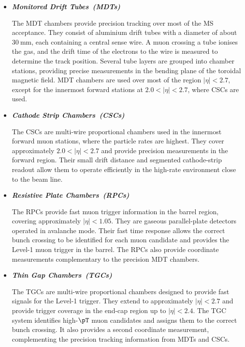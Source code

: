 \begin{itemize}
    \item \textbf{\textit{Monitored Drift Tubes~(MDTs)\quad}}

    The MDT chambers provide precision tracking over most of the MS acceptance.
    They consist of aluminium drift tubes with a diameter of about $30~\mathrm{mm}$, each containing a central sense wire.
    A muon crossing a tube ionises the gas, and the drift time of the electrons to the wire is measured to determine the track position.
    Several tube layers are grouped into chamber stations, providing precise measurements in the bending plane of the toroidal magnetic field.
    MDT chambers are used over most of the region $|\eta|<2.7$, except for the innermost forward stations at $2.0<|\eta|<2.7$, where CSCs are used.

    \item \textbf{\textit{Cathode Strip Chambers~(CSCs)\quad}}

    The CSCs are multi-wire proportional chambers used in the innermost forward muon stations, where the particle rates are highest.
    They cover approximately $2.0<|\eta|<2.7$ and provide precision measurements in the forward region.
    Their small drift distance and segmented cathode-strip readout allow them to operate efficiently in the high-rate environment close to the beam line.

    \item \textbf{\textit{Resistive Plate Chambers~(RPCs)\quad}}

    The RPCs provide fast muon trigger information in the barrel region, covering approximately $|\eta|<1.05$.
    They are gaseous parallel-plate detectors operated in avalanche mode.
    Their fast time response allows the correct bunch crossing to be identified for each muon candidate and provides the Level-1 muon trigger in the barrel.
    The RPCs also provide coordinate measurements complementary to the precision MDT chambers.

    \item \textbf{\textit{Thin Gap Chambers~(TGCs)\quad}}

    The TGCs are multi-wire proportional chambers designed to provide fast signals for the Level-1 trigger.
    They extend to approximately $|\eta|<2.7$ and provide trigger coverage in the end-cap region up to $|\eta|<2.4$.
    The TGC system identifies high-$\pT$ muon candidates and assigns them to the correct bunch crossing.
    It also provides a second coordinate measurement, complementing the precision tracking information from MDTs and CSCs.
\end{itemize}

